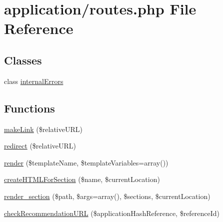 \hypertarget{routes_8php}{\section{application/routes.php File Reference}
\label{routes_8php}
}
\subsection*{Classes}
\begin{DoxyCompactItemize}
\item 
class \hyperlink{classinternal_errors}{internal\-Errors}
\end{DoxyCompactItemize}
\subsection*{Functions}
\begin{DoxyCompactItemize}
\item 
\hyperlink{routes_8php_ae637063de80a26b996e3d7597151222d}{make\-Link} (\$relative\-U\-R\-L)
\item 
\hyperlink{routes_8php_a81c2a281705bdea55e55fc2d77bfab06}{redirect} (\$relative\-U\-R\-L)
\item 
\hyperlink{routes_8php_ace89ff6281e5cf5d9132d58569b2b924}{render} (\$template\-Name, \$template\-Variables=array())
\item 
\hyperlink{routes_8php_a527384284538fb8ac63450f0027671fb}{create\-H\-T\-M\-L\-For\-Section} (\$name, \$current\-Location)
\item 
\hyperlink{routes_8php_a91d35fad6018d1c52b104bae4778e865}{render\-\_\-section} (\$path, \$args=array(), \$sections, \$current\-Location)
\item 
\hyperlink{routes_8php_a51a38ab688a6d85e56ade85de7e728a5}{check\-Recommendation\-U\-R\-L} (\$application\-Hash\-Reference, \$reference\-Id)
\end{DoxyCompactItemize}
